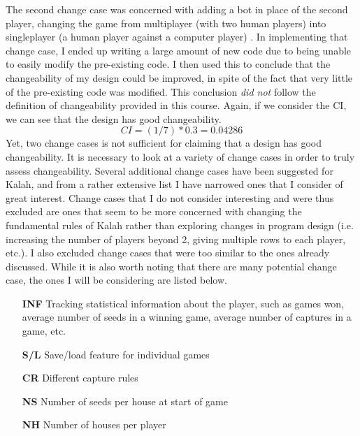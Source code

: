 \documentclass[10pt, a4paper, conference]{IEEEtran}
\begin{document}
The second change case was concerned with adding a bot in place of the second
player, changing the game from multiplayer (with two human players) into
singleplayer (a human player against a computer player) \cite{a5-change-case}.
In implementing that change case, I ended up writing a large amount of new code
due to being unable to easily modify the pre-existing code. I then used this to
conclude that the changeability of my design could be improved, in spite of the
fact that very little of the pre-existing code was modified. This conclusion
\textit{did not} follow the definition of changeability provided in this
course. Again, if we consider the CI, we can see that the design has good
changeability.
\begin{equation}
  CI = (1 / 7) * 0.3 = 0.04286
\end{equation}
Yet, two change cases is not sufficient for claiming that a design has good
changeability. It is necessary to look at a variety of change cases in order to
truly assess changeability. Several additional change cases have been suggested
for Kalah, and from a rather extensive list I have narrowed ones that
I consider of great interest. Change cases that I do not consider interesting
and were thus excluded are ones that seem to be more concerned with changing
the fundamental rules of Kalah rather than exploring changes in program design
(i.e. increasing the number of players beyond 2, giving multiple rows to each
player, etc.). I also excluded change cases that were too similar to the ones
already discussed. While it is also worth noting that there are many potential
change case, the ones I will be considering are listed below.\newline
\begin{itemize}
  \item[\textbf{INF}] Tracking statistical information about the player, such
    as games won, average number of seeds in a winning game, average number of
    captures in a game, etc.
  \item[\textbf{S/L}] Save/load feature for individual games
  \item[\textbf{CR}] Different capture rules
  \item[\textbf{NS}] Number of seeds per house at start of game
  \item[\textbf{NH}] Number of houses per player
\end{itemize}
\end{document}
